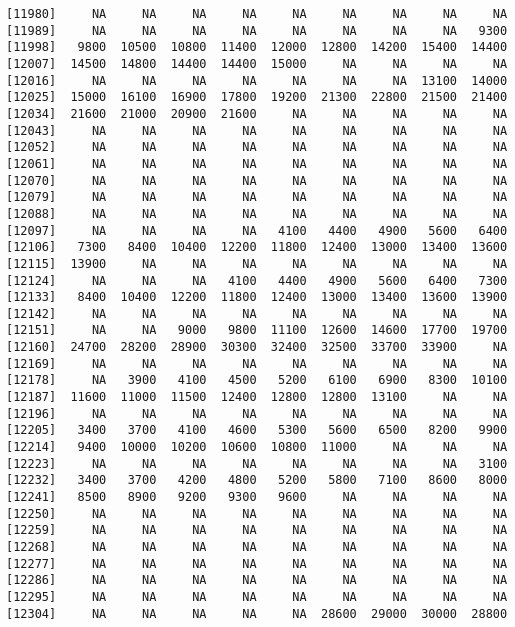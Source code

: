 \documentclass[]{article}
\begin{document}
\begin{verbatim}
[11980]     NA     NA     NA     NA     NA     NA     NA     NA     NA
[11989]     NA     NA     NA     NA     NA     NA     NA     NA   9300
[11998]   9800  10500  10800  11400  12000  12800  14200  15400  14400
[12007]  14500  14800  14400  14400  15000     NA     NA     NA     NA
[12016]     NA     NA     NA     NA     NA     NA     NA  13100  14000
[12025]  15000  16100  16900  17800  19200  21300  22800  21500  21400
[12034]  21600  21000  20900  21600     NA     NA     NA     NA     NA
[12043]     NA     NA     NA     NA     NA     NA     NA     NA     NA
[12052]     NA     NA     NA     NA     NA     NA     NA     NA     NA
[12061]     NA     NA     NA     NA     NA     NA     NA     NA     NA
[12070]     NA     NA     NA     NA     NA     NA     NA     NA     NA
[12079]     NA     NA     NA     NA     NA     NA     NA     NA     NA
[12088]     NA     NA     NA     NA     NA     NA     NA     NA     NA
[12097]     NA     NA     NA     NA   4100   4400   4900   5600   6400
[12106]   7300   8400  10400  12200  11800  12400  13000  13400  13600
[12115]  13900     NA     NA     NA     NA     NA     NA     NA     NA
[12124]     NA     NA     NA   4100   4400   4900   5600   6400   7300
[12133]   8400  10400  12200  11800  12400  13000  13400  13600  13900
[12142]     NA     NA     NA     NA     NA     NA     NA     NA     NA
[12151]     NA     NA   9000   9800  11100  12600  14600  17700  19700
[12160]  24700  28200  28900  30300  32400  32500  33700  33900     NA
[12169]     NA     NA     NA     NA     NA     NA     NA     NA     NA
[12178]     NA   3900   4100   4500   5200   6100   6900   8300  10100
[12187]  11600  11000  11500  12400  12800  12800  13100     NA     NA
[12196]     NA     NA     NA     NA     NA     NA     NA     NA     NA
[12205]   3400   3700   4100   4600   5300   5600   6500   8200   9900
[12214]   9400  10000  10200  10600  10800  11000     NA     NA     NA
[12223]     NA     NA     NA     NA     NA     NA     NA     NA   3100
[12232]   3400   3700   4200   4800   5200   5800   7100   8600   8000
[12241]   8500   8900   9200   9300   9600     NA     NA     NA     NA
[12250]     NA     NA     NA     NA     NA     NA     NA     NA     NA
[12259]     NA     NA     NA     NA     NA     NA     NA     NA     NA
[12268]     NA     NA     NA     NA     NA     NA     NA     NA     NA
[12277]     NA     NA     NA     NA     NA     NA     NA     NA     NA
[12286]     NA     NA     NA     NA     NA     NA     NA     NA     NA
[12295]     NA     NA     NA     NA     NA     NA     NA     NA     NA
[12304]     NA     NA     NA     NA     NA  28600  29000  30000  28800

\end{verbatim}
\end{document}
